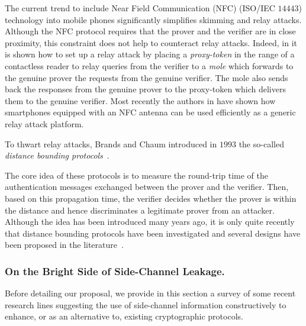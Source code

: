 \documentclass{llncs}
\begin{document}
The current trend to include Near Field Communication (NFC) (ISO/IEC $14443$) technology into mobile phones significantly simplifies skimming and relay attacks. Although the NFC protocol requires that the prover and the verifier are in close proximity, this constraint does not help to counteract relay attacks. Indeed, in \cite{Hancke05apractical} it is shown how to set up a relay attack by placing a {\em proxy-token} in the range of a contactless reader to relay queries from the verifier to a {\em mole} which forwards to the genuine prover the requests from the genuine verifier. The mole also sends back the responses from the genuine prover to the proxy-token which delivers them to the genuine verifier. Most recently the authors in \cite{DBLP:journals/iacr/FrancisHMM11,MendozaNFC} have shown how smartphones equipped with an NFC antenna can be used efficiently as a generic relay attack platform.

To thwart relay attacks, Brands and Chaum introduced in $1993$ the so-called \textit{distance bounding protocols}~\cite{Brands1994}.

The core idea of these protocols is to measure the round-trip time of the authentication messages exchanged between the prover and the verifier. Then, based on this propagation time, the verifier decides whether the prover is within the distance and hence discriminates a legitimate prover from an attacker.
Although the idea has been introduced many years ago, it is only quite recently that distance bounding protocols have been investigated and several designs have been 
proposed in the literature~\cite{DBLP:conf/fps/BrelurutGL15,DBLP:conf/wisec/TippenhauerLKC15}.

\subsubsection{On the Bright Side of Side-Channel Leakage.}
Before detailing our proposal, we provide in this section a survey of some recent research lines suggesting the use of side-channel information constructively to enhance, or as an alternative to, existing cryptographic protocols.
	
\end{document}
